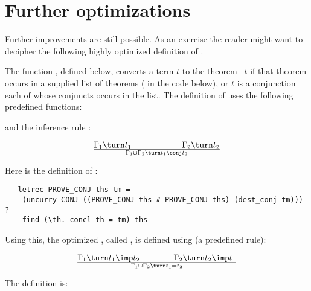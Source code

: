 \section{Further optimizations}

Further improvements are still possible. As an exercise the reader
might want to decipher the following highly optimized definition of
.

The function , defined below, 
converts a term $t$ to the theorem \ml{|-}~$t$
if that theorem occurs in a supplied list of theorems ( in the
code below), or $t$ is a conjunction each of whose conjuncts occurs in
the list. The definition of  uses the following
predefined \ML{} functions:


\noindent and the inference rule :


\[ \Gamma_1\turn
t_1\qquad\qquad\qquad\Gamma_2\turn t_2\over \Gamma_1\cup\Gamma_2 \turn t_1\conj
t_2 \]


\noindent Here is the definition of :

\begin{hol}\begin{verbatim}
   letrec PROVE_CONJ ths tm =
    (uncurry CONJ ((PROVE_CONJ ths # PROVE_CONJ ths) (dest_conj tm))) ?
    find (\th. concl th = tm) ths
\end{verbatim}\end{hol}

\noindent Using this, the optimized , called
, is defined using  (a predefined rule):


\[ \Gamma_1 \turn t_1 \imp t_2 \qquad\qquad \Gamma_2\turn t_2 \imp t_1\over
\Gamma_1 \cup \Gamma_2 \turn t_1 = t_2\]

\noindent The definition is:

